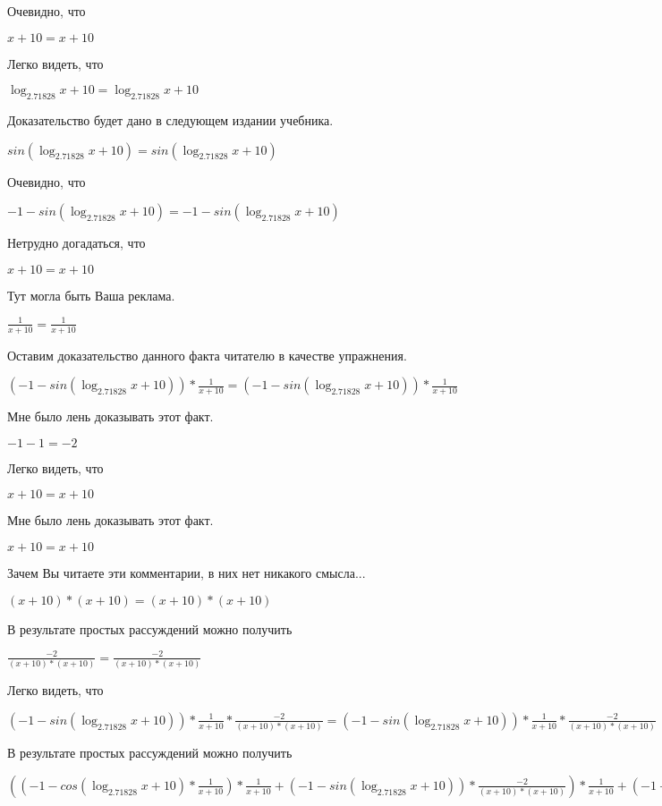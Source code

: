 \documentclass[12pt,a4paper,fleqn]{article}
\theoremstyle{definition}
\begin{document}
Очевидно, что

$ x  +  10  =  x  +  10 $

Легко видеть, что

$\log_{ 2.71828 }{ x  +  10 } = \log_{ 2.71828 }{ x  +  10 }$

Доказательство будет дано в следующем издании учебника.

$sin(\log_{ 2.71828 }{ x  +  10 }) = sin(\log_{ 2.71828 }{ x  +  10 })$

Очевидно, что

$ -1  - sin(\log_{ 2.71828 }{ x  +  10 }) =  -1  - sin(\log_{ 2.71828 }{ x  +  10 })$

Нетрудно догадаться, что

$ x  +  10  =  x  +  10 $

Тут могла быть Ваша реклама.

$\frac{ 1 }{ x  +  10 }
 = \frac{ 1 }{ x  +  10 }
$

Оставим доказательство данного факта читателю в качестве упражнения.

$( -1  - sin(\log_{ 2.71828 }{ x  +  10 })) * \frac{ 1 }{ x  +  10 }
 = ( -1  - sin(\log_{ 2.71828 }{ x  +  10 })) * \frac{ 1 }{ x  +  10 }
$

Мне было лень доказывать этот факт.

$ -1  -  1  =  -2 $

Легко видеть, что

$ x  +  10  =  x  +  10 $

Мне было лень доказывать этот факт.

$ x  +  10  =  x  +  10 $

Зачем Вы читаете эти комментарии, в них нет никакого смысла...

$( x  +  10 ) * ( x  +  10 ) = ( x  +  10 ) * ( x  +  10 )$

В результате простых рассуждений можно получить

$\frac{ -2 }{( x  +  10 ) * ( x  +  10 )}
 = \frac{ -2 }{( x  +  10 ) * ( x  +  10 )}
$

Легко видеть, что

$( -1  - sin(\log_{ 2.71828 }{ x  +  10 })) * \frac{ 1 }{ x  +  10 }
 * \frac{ -2 }{( x  +  10 ) * ( x  +  10 )}
 = ( -1  - sin(\log_{ 2.71828 }{ x  +  10 })) * \frac{ 1 }{ x  +  10 }
 * \frac{ -2 }{( x  +  10 ) * ( x  +  10 )}
$

В результате простых рассуждений можно получить

$(( -1  - cos(\log_{ 2.71828 }{ x  +  10 }) * \frac{ 1 }{ x  +  10 }
) * \frac{ 1 }{ x  +  10 }
 + ( -1  - sin(\log_{ 2.71828 }{ x  +  10 })) * \frac{ -2 }{( x  +  10 ) * ( x  +  10 )}
) * \frac{ 1 }{ x  +  10 }
 + ( -1  - sin(\log_{ 2.71828 }{ x  +  10 })) * \frac{ 1 }{ x  +  10 }
 * \frac{ -2 }{( x  +  10 ) * ( x  +  10 )}
 = (( -1  - cos(\log_{ 2.71828 }{ x  +  10 }) * \frac{ 1 }{ x  +  10 }
) * \frac{ 1 }{ x  +  10 }
 + ( -1  - sin(\log_{ 2.71828 }{ x  +  10 })) * \frac{ -2 }{( x  +  10 ) * ( x  +  10 )}
) * \frac{ 1 }{ x  +  10 }
 + ( -1  - sin(\log_{ 2.71828 }{ x  +  10 })) * \frac{ 1 }{ x  +  10 }
 * \frac{ -2 }{( x  +  10 ) * ( x  +  10 )}
$
\end{document}
